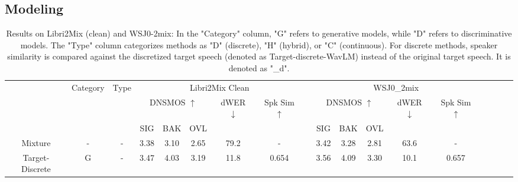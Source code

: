 \documentclass[conference]{IEEEtran}
\begin{document}
\subsection{Modeling}

\begin{table}
  \caption{Results on Libri2Mix (clean) and WSJ0-2mix: In the "Category" column, "G" refers to generative models, while "D" refers to discriminative models. The "Type" column categorizes methods as "D" (discrete), "H" (hybrid), or "C" (continuous).
  For discrete methods, speaker similarity is compared against the discretized target speech (denoted as Target-discrete-WavLM) instead of the original target speech. It is denoted as "\_d".}
  \renewcommand{\arraystretch}{1.2}
  \begin{center}
  \begin{tabular}{cccccccccccccccccc}
    \Xhline{2\arrayrulewidth} %
  \multirow{3}{*}{System} & \multicolumn{1}{l}{\multirow{3}{*}{Category}} & \multicolumn{1}{l}{\multirow{3}{*}{Type}} &  \multicolumn{5}{c}{Libri2Mix Clean}                    &                               & \multicolumn{5}{c}{WSJ0\_2mix}                                                  \\
  \cline{4-8} \cline{10-14}
                          & \multicolumn{1}{l}{}                                                 & \multicolumn{1}{l}{}                            & \multicolumn{3}{c}{DNSMOS $\uparrow$} & dWER $\downarrow$ & Spk Sim $\uparrow$ &  & \multicolumn{3}{c}{DNSMOS $\uparrow$} & dWER $\downarrow$ & Spk Sim $\uparrow$  \\ \cline{4-6} \cline{10-12}
                          & \multicolumn{1}{l}{}                                                    & \multicolumn{1}{l}{}                            & SIG         & BAK        & OVL        &                   &        &             & SIG         & BAK        & OVL        &                   &                    \\ \hline
  Mixture                 & -                                             & -                                                                                           & 3.38        & 3.10       & 2.65       & 79.2            & -        &           & 3.42        & 3.28       & 2.81       & 63.6            & -                  \\
  Target-Discrete         & G                                             & -                                                                                          & 3.47       & 4.03       & 3.19       & 11.8            & 0.654     &          & 3.56        & 4.09       & 3.30       & 10.1            & 0.657               \\ \hline

\end{tabular}
\end{center}
\end{table}
\end{document}
